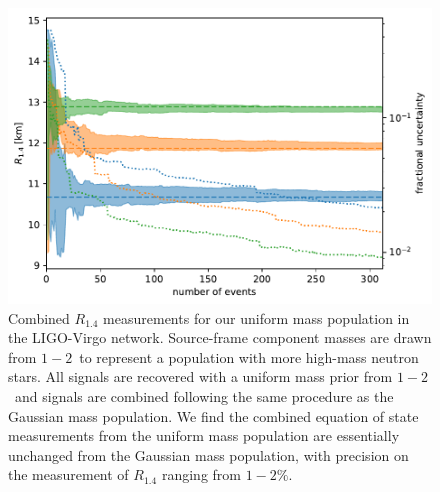 \begin{figure}[ht]
\includegraphics[width=\textwidth]{Figures/eos-meas/final_pop_hlv_combined_radius_3eos_uniform_prior_uniform_pop_seed3_bw0p3_312events.pdf}
\caption{
Combined $R_{1.4}$ measurements for our uniform mass population in the LIGO-Virgo network. Source-frame component masses are drawn from $1-2$\msun\ to represent a population with more high-mass neutron stars. All signals are recovered with a uniform mass prior from $1-2$\msun\ and signals are combined following the same procedure as the Gaussian mass population. We find the combined equation of state measurements from the uniform mass population are essentially unchanged from the Gaussian mass population, with precision on the measurement of $R_{1.4}$ ranging from $1-2\%$. 
}
\label{fig:hlv_combined_uniform_pop}
\end{figure}

